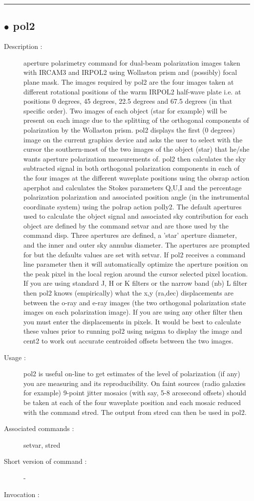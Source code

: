 \hrule \subsection*{$\bullet$ pol2}
\begin{description}
\item[Description :] aperture polarimetry command for dual-beam polarization images
taken with {\sc IRCAM3} and IRPOL2 using Wollaston prism and (possibly) focal
plane mask. The images required by pol2 are the four images taken at
different rotational positions of the warm IRPOL2 half-wave plate i.e. at
positions 0 degrees, 45 degrees, 22.5 degrees and 67.5 degrees (in that
specific order).  Two images of each object (star for example) will be
present on each image due to the splitting of the orthogonal components
of polarization by the Wollaston prism.  pol2 displays the first (0
degrees) image on the current graphics device and asks the user to select
with the cursor the southern-most of the two images of the object (star)
that he/she wants aperture polarization measurements of.  pol2 then
calculates the sky subtracted signal in both orthogonal polarization
components in each of the four images at the different waveplate
positions using the obsrap action aperphot and calculates the Stokes
parameters Q,U,I and the percentage polarization polarization and
associated position angle (in the instrumental coordinate system) using
the polrap action polly2.  The default apertures used to calculate the
object signal and associated sky contribution for each object are defined
by the command setvar and are those used by the command disp.  Three
apertures are defined, a 'star' aperture diameter, and the inner and
outer sky annulus diameter. The apertures are prompted for but the
defaults values are set with setvar. If pol2 receives a command line
parameter then it will automatically optimize the aperture position on
the peak pixel in the local region around the cursor selected pixel
location.  If you are using standard J, H or K filters or the narrow band
(nb) L filter then pol2 knows (empirically) what the x,y (ra,dec)
displacements are between the o-ray and e-ray images (the two orthogonal
polarization state images on each polarization image).  If you are using
any other filter then you must enter the displacements in pixels.  It
would be best to calculate these values prior to running pol2 using
nsigma to display the image and cent2 to work out accurate centroided
offsets between the two images.
\item[Usage :] pol2 is useful on-line to get estimates of the level of
polarization (if any) you are measuring and its reproducibility.  On
faint sources (radio galaxies for example) 9-point jitter mosaics (with
say, 5-8 arcsecond offsets) should be taken at each of the four waveplate
position and each mosaic reduced with the command stred.  The output from
stred can then be used in pol2.
\item[Associated commands :] setvar, stred
\item[Short version of command :] -
\item[Invocation :]


\end{description}
